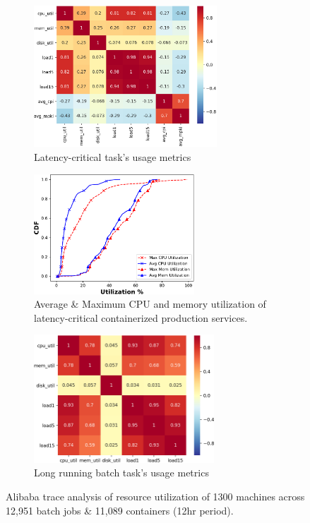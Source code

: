 \begin{figure}
\hspace{-10mm}
\begin{subfigure}[t!]{.42\textwidth}
  \includegraphics[width=.99\linewidth ,height=5.3cm, width=6.7cm]{results/container_usage.png}
  \caption{Latency-critical task's usage metrics}
  \label{fig:container}
 \end{subfigure}%
 \hspace{-5mm}
  \begin{subfigure}[t!]{0.3\textwidth}
  \includegraphics[width=.99\linewidth,height=4.5cm, width=5.3cm]{results/cdf.pdf}
  \caption{Average \& Maximum CPU and memory utilization of latency-critical containerized production services.}
  \label{fig:cont-mem}
\end{subfigure}%
  \begin{subfigure}[t!]{0.33\textwidth}

  \includegraphics[width=.99\linewidth, height=4.8cm,width=6.4cm]{results/batch_usage.png}
  \hspace{2mm}
  \caption{Long running batch task's usage metrics}
  \label{fig:batch}
\end{subfigure}%
\vspace{-2mm}
\caption{Alibaba trace analysis of resource utilization of 1300 machines across 12,951 batch jobs \& 11,089 containers (12hr period).}
\label{fig:ali}
\end{figure}

